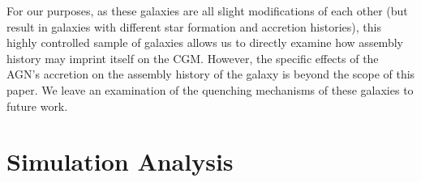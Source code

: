 \documentclass[]{emulateapj}
\begin{document}
For our purposes, as these galaxies are all slight modifications of each other (but result in galaxies with different star formation and accretion histories), this highly controlled sample of galaxies allows us to directly examine how assembly history may imprint itself on the CGM. However, the specific effects of the AGN's accretion on the assembly history of the galaxy is beyond the scope of this paper. We leave an examination of the quenching mechanisms of these galaxies to future work. 




\section{Simulation Analysis}\label{redux}
\end{document}
